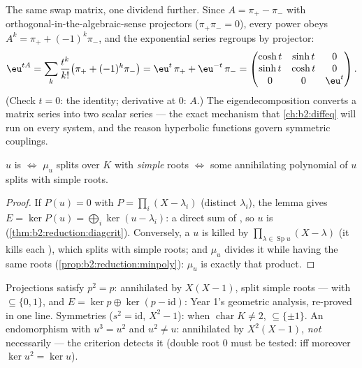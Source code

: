 \begin{example}\label{ex:b2:reduction:expprojectors}
The same swap matrix, one dividend further. Since $A = \pi_+ -
\pi_-$ with orthogonal-in-the-algebraic-sense projectors
($\pi_+\pi_- = 0$), every power obeys $A^k = \pi_+ +
(-1)^k\pi_-$, and the exponential series regroups by projector:
\[
\eu^{tA} = \sum_k \frac{t^k}{k!}\bigl(\pi_+ +
(-1)^k\pi_-\bigr)
= \eu^{t}\,\pi_+ + \eu^{-t}\,\pi_- =
\begin{pmatrix}
\cosh t & \sinh t & 0\\
\sinh t & \cosh t & 0\\
0 & 0 & \eu^{t}
\end{pmatrix}.
\]
(Check $t = 0$: the identity; derivative at $0$: $A$.) The
eigendecomposition converts a matrix series into two scalar
series --- the exact mechanism that \cref{ch:b2:diffeq} will
run on every  system, and the reason hyperbolic
functions govern symmetric couplings.
\end{example}

\begin{corollary}\label{cor:b2:reduction:minpolycrit}
$u$ is  $\iff$ $\mu_u$ splits over $K$ with
\emph{simple} roots $\iff$ some annihilating polynomial of $u$
splits with simple roots.
\end{corollary}

\begin{proof}
If $P(u) = 0$ with $P = \prod_{i}(X - \lambda_i)$ (distinct
$\lambda_i$), the lemma gives $E = \ker P(u) = \bigoplus_i \ker(u -
\lambda_i)$: a direct sum of , so $u$ is 
(\cref{thm:b2:reduction:diagcrit}). Conversely, a 
$u$ is killed by $\prod_{\lambda \in \operatorname{Sp}u}(X -
\lambda)$ (it kills each ), which splits with simple
roots; and $\mu_u$ divides it while having the same roots
(\cref{prop:b2:reduction:minpoly}): $\mu_u$ is exactly that product.
\end{proof}

\begin{example}\label{ex:b2:reduction:projections}
Projections satisfy $p^2 = p$: annihilated by $X(X-1)$, split simple
roots ---  with  $\subseteq \{0, 1\}$, and $E =
\ker p \oplus \ker(p - \mathrm{id})$: Year 1's geometric analysis,
re-proved in one line. Symmetries ($s^2 = \mathrm{id}$,
 $X^2 - 1$):  when $\operatorname{char} K
\neq 2$,  $\subseteq \{\pm 1\}$. An endomorphism with $u^3 =
u^2$ and $u^2 \neq u$: annihilated by $X^2(X - 1)$, \emph{not}
necessarily  --- the criterion detects it (double root
$0$ must be tested:  iff moreover $\ker u^2 = \ker
u$).
\end{example}

